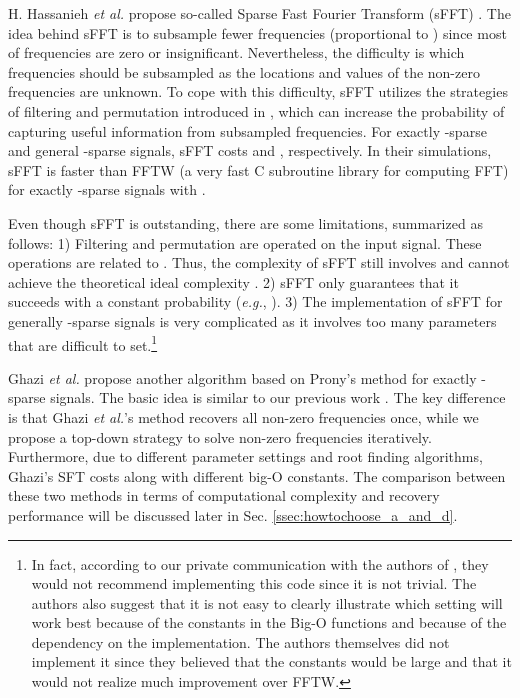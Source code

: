 \documentclass[journal,onecolumn,11pt]{IEEEtran}
\begin{document}
H. Hassanieh {\em et al.} propose so-called Sparse Fast Fourier Transform (sFFT) \cite{Haitham2012}\cite{Haitham2012_1}. The idea behind sFFT is to subsample fewer frequencies (proportional to ) since most of frequencies are zero or insignificant.
Nevertheless, the difficulty is which frequencies should be subsampled as the locations and values of the  non-zero frequencies are unknown. To cope with this difficulty, sFFT utilizes the strategies of filtering and permutation introduced in \cite{Gilbert2005}, which can increase the probability of capturing useful information from subsampled frequencies.
For exactly -sparse and general -sparse signals, sFFT costs  and , respectively.
In their simulations, sFFT is faster than FFTW \cite{Frigo2005} (a very fast C subroutine library for computing FFT) for exactly -sparse signals with .


Even though sFFT \cite{Haitham2012}\cite{Haitham2012_1} is outstanding, there are some limitations, summarized as follows:
1) Filtering and permutation are operated on the input signal. These operations are related to .
Thus, the complexity of sFFT still involves  and cannot achieve the theoretical ideal complexity .
2) sFFT only guarantees that it succeeds with a constant probability ({\em e.g.}, ).
3) The implementation of sFFT for generally -sparse signals is very complicated as it involves too many parameters that are difficult to set.\footnote{In fact, according to our private communication with the authors of \cite{Haitham2012}\cite{Haitham2012_1}, they would not recommend implementing this code since it is not trivial. The authors also suggest that it is not easy to clearly illustrate which setting will work best because of the constants in the Big-O functions and because of the dependency on the implementation. The authors themselves did not implement it since they believed that the constants would be large and that it would not realize much improvement over FFTW.}

Ghazi {\em et al.} \cite{Ghazi2013} propose another algorithm based on Prony's method for exactly -sparse signals.
The basic idea is similar to our previous work \cite{Hsieh2013}.
The key difference is that Ghazi {\em et al.}'s method recovers all  non-zero frequencies once, while we propose a top-down strategy to solve  non-zero frequencies iteratively. Furthermore, due to different parameter settings and root finding algorithms, Ghazi's SFT costs  along with different big-O constants. The comparison between these two methods in terms of computational complexity and recovery performance will be discussed later in Sec. \ref{ssec:howtochoose_a_and_d}.
\end{document}
